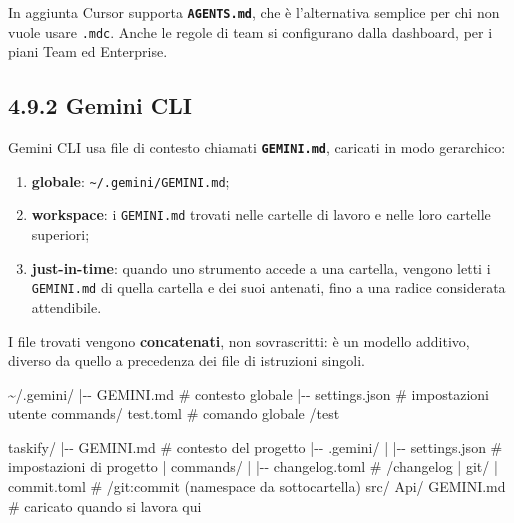 \documentclass[
  italian,
  10pt,
]{book}
\newenvironment{Shaded}{\begin{snugshade}}{\end{snugshade}}
\newcommand{\NormalTok}[1]{#1}
\providecommand{\tightlist}{%
  \setlength{\itemsep}{0pt}\setlength{\parskip}{0pt}}
\begin{document}
In aggiunta Cursor supporta \textbf{\texttt{AGENTS.md}}, che è
l'alternativa semplice per chi non vuole usare \texttt{.mdc}. Anche le
regole di team si configurano dalla dashboard, per i piani Team ed
Enterprise.

\subsection{4.9.2 Gemini CLI}\label{gemini-cli}

Gemini CLI usa file di contesto chiamati \textbf{\texttt{GEMINI.md}},
caricati in modo gerarchico:

\begin{enumerate}
\def\labelenumi{\arabic{enumi}.}
\tightlist
\item
  \textbf{globale}: \texttt{\textasciitilde{}/.gemini/GEMINI.md};
\item
  \textbf{workspace}: i \texttt{GEMINI.md} trovati nelle cartelle di
  lavoro e nelle loro cartelle superiori;
\item
  \textbf{just-in-time}: quando uno strumento accede a una cartella,
  vengono letti i \texttt{GEMINI.md} di quella cartella e dei suoi
  antenati, fino a una radice considerata attendibile.
\end{enumerate}

I file trovati vengono \textbf{concatenati}, non sovrascritti: è un
modello additivo, diverso da quello a precedenza dei file di istruzioni
singoli.

\begin{Shaded}
\begin{Highlighting}[]
\NormalTok{\textasciitilde{}/.gemini/}
\NormalTok{|{-}{-} GEMINI.md                 \# contesto globale}
\NormalTok{|{-}{-} settings.json             \# impostazioni utente}
\NormalTok{\textasciigrave{}{-}{-} commands/}
\NormalTok{    \textasciigrave{}{-}{-} test.toml             \# comando globale /test}

\NormalTok{taskify/}
\NormalTok{|{-}{-} GEMINI.md                 \# contesto del progetto}
\NormalTok{|{-}{-} .gemini/}
\NormalTok{|   |{-}{-} settings.json         \# impostazioni di progetto}
\NormalTok{|   \textasciigrave{}{-}{-} commands/}
\NormalTok{|       |{-}{-} changelog.toml    \# /changelog}
\NormalTok{|       \textasciigrave{}{-}{-} git/}
\NormalTok{|           \textasciigrave{}{-}{-} commit.toml   \# /git:commit (namespace da sottocartella)}
\NormalTok{\textasciigrave{}{-}{-} src/}
\NormalTok{    \textasciigrave{}{-}{-} Api/}
\NormalTok{        \textasciigrave{}{-}{-} GEMINI.md         \# caricato quando si lavora qui}
\end{Highlighting}
\end{Shaded}
\end{document}
